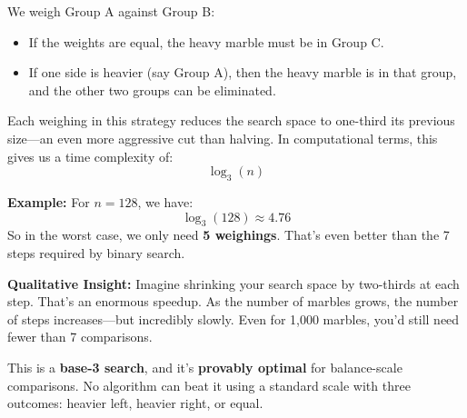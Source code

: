 We weigh Group A against Group B:
\begin{itemize}
  \item If the weights are equal, the heavy marble must be in Group C.
  \item If one side is heavier (say Group A), then the heavy marble is in that group, and the other two groups can be eliminated.
\end{itemize}

Each weighing in this strategy reduces the search space to one-third its previous size—an even more aggressive cut than halving. In computational terms, this gives us a time complexity of:
\[
\log_3(n)
\]

\medskip

\noindent\textbf{Example:} For \( n = 128 \), we have:
\[
\log_3(128) \approx 4.76
\]
So in the worst case, we only need \textbf{5 weighings}. That’s even better than the 7 steps required by binary search.

\medskip

\noindent\textbf{Qualitative Insight:} Imagine shrinking your search space by two-thirds at each step. That’s an enormous speedup. As the number of marbles grows, the number of steps increases—but incredibly slowly. Even for 1,000 marbles, you’d still need fewer than 7 comparisons.

This is a \textbf{base-3 search}, and it’s \textbf{provably optimal} for balance-scale comparisons. No algorithm can beat it using a standard scale with three outcomes: heavier left, heavier right, or equal.

\begin{center}
\end{center}



